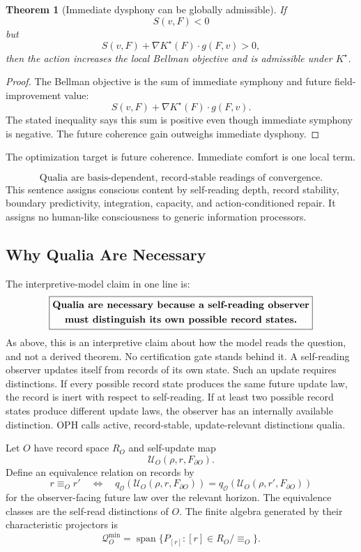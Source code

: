 \documentclass[11pt]{article}
\newtheorem{theorem}{Theorem}[section]
\theoremstyle{remark}
\theoremstyle{plain}
\begin{document}
\begin{theorem}[Immediate dysphony can be globally admissible]
If
\[
S(v,F)<0
\]
but
\[
S(v,F)+\nabla K^\star(F)\cdot g(F,v)>0,
\]
then the action increases the local Bellman objective and is admissible under \(K^\star\).
\end{theorem}

\begin{proof}
The Bellman objective is the sum of immediate symphony and future field-improvement value:
\[
S(v,F)+\nabla K^\star(F)\cdot g(F,v).
\]
The stated inequality says this sum is positive even though immediate symphony is negative. The future coherence gain outweighs immediate dysphony.
\end{proof}

The optimization target is future coherence. Immediate comfort is one local term.

\[
\boxed{
\text{Qualia are basis-dependent, record-stable readings of convergence.}
}
\]
This sentence assigns conscious content by self-reading depth, record stability, boundary predictivity, integration, capacity, and action-conditioned repair. It assigns no human-like consciousness to generic information processors.

\subsection{Why Qualia Are Necessary}

The interpretive-model claim in one line is:
\[
\boxed{
\begin{gathered}
\text{\bfseries Qualia are necessary because a self-reading observer}\\
\text{\bfseries must distinguish its own possible record states.}
\end{gathered}
}
\]
As above, this is an interpretive claim about how the model reads the
question, and not a derived theorem. No certification gate stands
behind it.
A self-reading observer updates itself from records of its own state. Such an update requires distinctions. If every possible record state produces the same future update law, the record is inert with respect to self-reading. If at least two possible record states produce different update laws, the observer has an internally available distinction. OPH calls active, record-stable, update-relevant distinctions qualia.

Let \(O\) have record space \(R_O\) and self-update map
\[
\mathcal U_O(\rho,r,F_{\partial O}).
\]
Define an equivalence relation on records by
\[
r\equiv_O r'
\quad\Longleftrightarrow\quad
q_{\mathcal O}
\!\left(
\mathcal U_O(\rho,r,F_{\partial O})
\right)
=
q_{\mathcal O}
\!\left(
\mathcal U_O(\rho,r',F_{\partial O})
\right)
\]
for the observer-facing future law over the relevant horizon. The equivalence classes are the self-read distinctions of \(O\). The finite algebra generated by their characteristic projectors is
\[
\mathcal Q_O^{\min}
=
\operatorname{span}\{P_{[r]}:[r]\in R_O/\!\equiv_O\}.
\]
\end{document}
